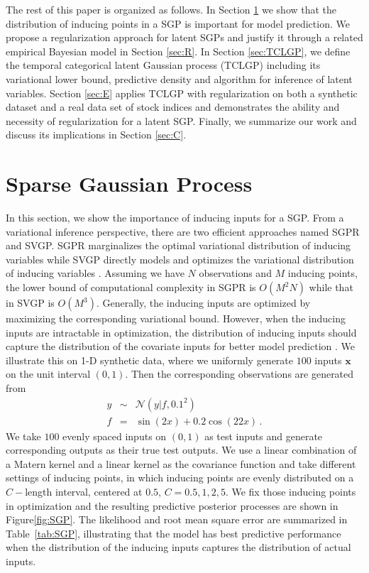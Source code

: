 \documentclass{article}
\begin{document}
The rest of this paper is organized as follows. In Section \ref{sec:SGP} we show that the distribution of inducing points in a SGP is important for model prediction. We propose a regularization approach for latent SGPs and justify it through a related empirical Bayesian model in Section \ref{sec:R}. In Section \ref{sec:TCLGP}, we define the temporal categorical latent Gaussian process (TCLGP) including its variational lower bound, predictive density and algorithm for inference of latent variables. Section \ref{sec:E} applies TCLGP with regularization on both a synthetic dataset and a real data set of stock indices and demonstrates the ability and necessity of regularization for a latent SGP. Finally, we summarize our work and discuss its implications in Section \ref{sec:C}.


\section{Sparse Gaussian Process} \label{sec:SGP}
In this section, we show the importance of inducing inputs for a SGP. From a variational inference perspective, there are two efficient approaches named SGPR and SVGP. SGPR marginalizes the optimal variational distribution of inducing variables \citep{Titsias_2009} while SVGP directly models and optimizes the variational distribution of inducing variables \citep{Hensman_2013}. Assuming we have $N$ observations and $M$ inducing points, the lower bound of computational complexity in SGPR is $O(M^2N)$ while that in SVGP is $O(M^3)$. Generally, the inducing inputs are optimized by maximizing the corresponding variational bound. However, when the inducing inputs are intractable in optimization, the distribution of inducing inputs should capture the distribution of the covariate inputs for better model prediction \cite{Raj_2011}. We illustrate this on 1-D synthetic data, where we uniformly generate $100$ inputs $\bm x$ on the unit interval $(0,1)$. Then the corresponding observations are generated from 
\begin{eqnarray}
y & \sim & \mathcal{N}(y|f, 0.1^2) \nonumber \\
f & = & \sin(2x) + 0.2\cos(22x) \nonumber \,.
\end{eqnarray} 
We take $100$ evenly spaced inputs on $(0,1)$ as test inputs and generate corresponding outputs as their true test outputs. We use a linear combination of a Matern kernel and a linear kernel as the covariance function and take different settings of inducing points, in which inducing points are evenly distributed on a $C-$length interval, centered at $0.5$, $C = 0.5, 1, 2, 5$. We fix those inducing points in optimization and the resulting predictive posterior processes are shown in Figure\ref{fig:SGP}. The likelihood and root mean square error are summarized in Table~\ref{tab:SGP}, illustrating that the model has best predictive performance when the distribution of the inducing inputs captures the distribution of actual inputs.
\end{document}
